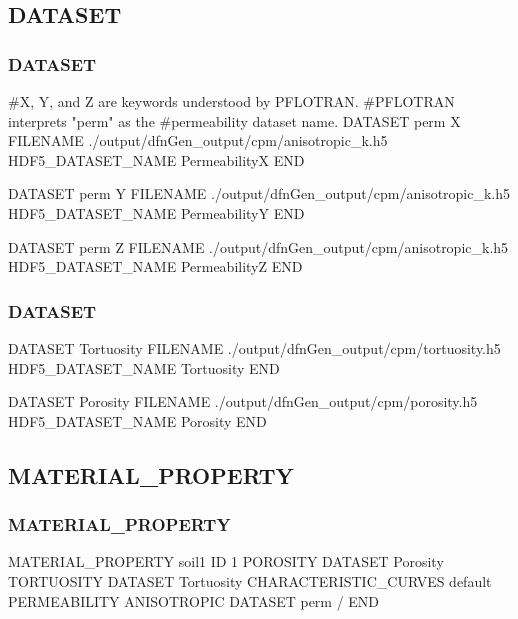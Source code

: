 \documentclass{beamer}
\newcommand\bluecomment[1]{{{\color{blue} #1}}}
\newcommand\magentacomment[1]{{{\color{magenta} #1}}}
\begin{document}
\subsection{DATASET}
\begin{frame}\frametitle{DATASET}
	\begin{semiverbatim}
\bluecomment{#X, Y, and Z are keywords understood by PFLOTRAN. 
#PFLOTRAN interprets "perm" as the 
#permeability dataset name.}
DATASET perm\magentacomment{X}
  FILENAME ./output/dfnGen_output/cpm/anisotropic_k.h5
  HDF5_DATASET_NAME PermeabilityX
END

DATASET perm\magentacomment{Y}
  FILENAME ./output/dfnGen_output/cpm/anisotropic_k.h5
  HDF5_DATASET_NAME PermeabilityY
END

DATASET perm\magentacomment{Z}
  FILENAME ./output/dfnGen_output/cpm/anisotropic_k.h5
  HDF5_DATASET_NAME PermeabilityZ
END
	\end{semiverbatim}
	
\end{frame}

\begin{frame}\frametitle{DATASET}
	\begin{semiverbatim}
DATASET Tortuosity
  FILENAME ./output/dfnGen_output/cpm/tortuosity.h5
  HDF5_DATASET_NAME Tortuosity
END
		
DATASET Porosity
  FILENAME ./output/dfnGen_output/cpm/porosity.h5
  HDF5_DATASET_NAME Porosity
END
	\end{semiverbatim}
	
\end{frame}

\subsection{MATERIAL\_PROPERTY}
\begin{frame}\frametitle{MATERIAL\_PROPERTY}
	\begin{semiverbatim}
		MATERIAL_PROPERTY soil1
		  ID 1
		  POROSITY DATASET Porosity
		  TORTUOSITY DATASET Tortuosity
		  CHARACTERISTIC_CURVES default
		  PERMEABILITY
		    ANISOTROPIC
		    \magentacomment{DATASET perm}
		  /
		END
	\end{semiverbatim}
\end{frame}
\end{document}
